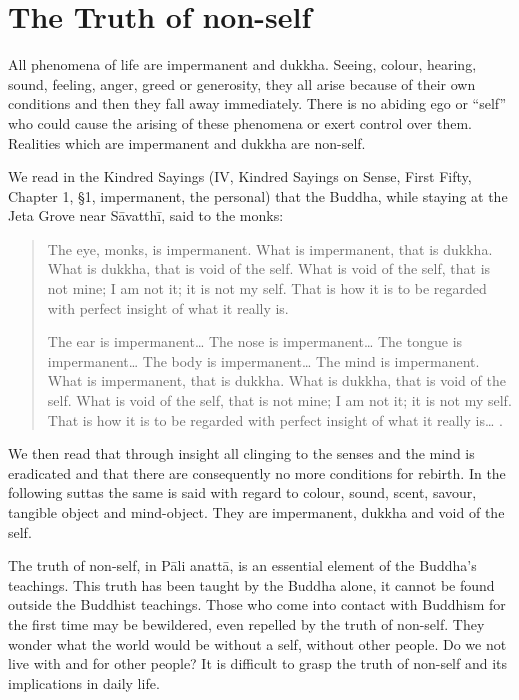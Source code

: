 \documentclass{book}
\begin{document}
\chapter{The Truth of non-self}

All phenomena of life are impermanent and dukkha. Seeing, colour,
hearing, sound, feeling, anger, greed or generosity, they all arise
because of their own conditions and then they fall away immediately.
There is no abiding ego or ``self'' who could cause the arising of these
phenomena or exert control over them. Realities which are impermanent
and dukkha are non-self.

We read in the Kindred Sayings (IV, Kindred Sayings on Sense, First
Fifty, Chapter 1, §1, impermanent, the personal) that the Buddha, while
staying at the Jeta Grove near Sāvatthī, said to the monks:

\begin{quote}
The eye, monks, is impermanent. What is impermanent, that is dukkha.
What is dukkha, that is void of the self. What is void of the self, that
is not mine; I am not it; it is not my self. That is how it is to be
regarded with perfect insight of what it really is.

The ear is impermanent\ldots{} The nose is impermanent\ldots{} The
tongue is impermanent\ldots{} The body is impermanent\ldots{} The mind
is impermanent. What is impermanent, that is dukkha. What is dukkha,
that is void of the self. What is void of the self, that is not mine; I
am not it; it is not my self. That is how it is to be regarded with
perfect insight of what it really is\ldots{} .
\end{quote}

We then read that through insight all clinging to the senses and the
mind is eradicated and that there are consequently no more conditions
for rebirth. In the fol­lowing suttas the same is said with regard to
colour, sound, scent, savour, tangible object and mind-object. They are
impermanent, dukkha and void of the self.

The truth of non-self, in Pāli anattā, is an essential element of the
Buddha's teachings. This truth has been taught by the Buddha alone, it
cannot be found outside the Buddhist teachings. Those who come into
contact with Buddhism for the first time may be bewildered, even
repelled by the truth of non-self. They wonder what the world would be
without a self, without other people. Do we not live with and for other
people? It is difficult to grasp the truth of non-self and its
implications in daily life.
\end{document}
